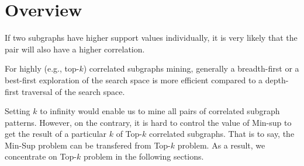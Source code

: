 \section{Overview}
\label{sec:overview}

\begin{observation}
\label{ob:frequency}
If two subgraphs have higher support values individually, it is very likely that the pair will also have a higher correlation.
\end{observation}

\begin{observation}
\label{ob:dfs}
For highly (e.g., top-$k$) correlated subgraphs mining, generally a breadth-first or a best-first exploration of the search space is more efficient
compared to a depth-first traversal of the search space.
\end{observation}

Setting $k$ to infinity would enable us to mine all pairs of correlated subgraph patterns. However, on the contrary, it is hard to control the value of {\sf Min-sup} to get the result of a particular $k$ of {\sf Top-$k$} correlated subgraphs. That is to say, the {\sf Min-Sup} problem can be transfered from {\sf Top-$k$} problem. As a result, we concentrate on {\sf Top-$k$} problem in the following sections. 